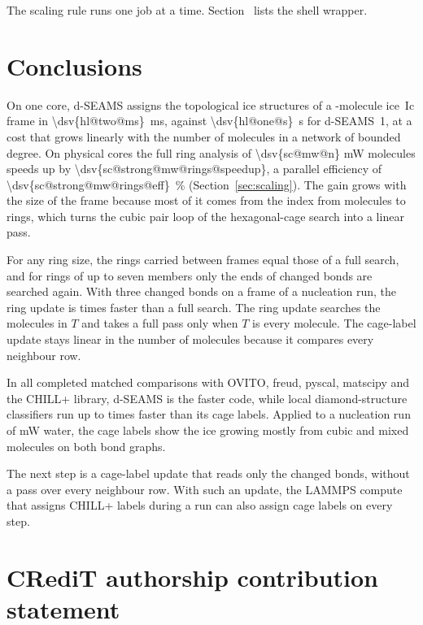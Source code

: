 \documentclass[preprint,12pt]{elsarticle}
\begin{document}
The scaling rule runs one job at a time.
Section~ lists the shell wrapper.

\section{Conclusions}
\label{sec:conclusions}

On one core, d-SEAMS assigns the topological ice structures of a -molecule ice~Ic frame in \qty{\dsv{hl@two@ms}}{\milli\second}, against \qty{\dsv{hl@one@s}}{\second} for d-SEAMS~1, at a cost that grows linearly with the number of molecules in a network of bounded degree.
On  physical cores the full ring analysis of \num{\dsv{sc@mw@n}} mW molecules speeds up by \num{\dsv{sc@strong@mw@rings@speedup}}, a parallel efficiency of \qty{\dsv{sc@strong@mw@rings@eff}}{\percent} (Section~\ref{sec:scaling}).
The gain grows with the size of the frame because most of it comes from the index from molecules to rings, which turns the cubic pair loop of the hexagonal-cage search into a linear pass.

For any ring size, the rings carried between frames equal those of a full search, and for rings of up to seven members only the ends of changed bonds are searched again.
With three changed bonds on a frame of a nucleation run, the ring update is  times faster than a full search.
The ring update searches the molecules in $T$ and takes a full pass only when $T$ is every molecule.
The cage-label update stays linear in the number of molecules because it compares every neighbour row.

In all  completed matched comparisons with OVITO, freud, pyscal, matscipy and the CHILL+ library, d-SEAMS is the faster code, while local diamond-structure classifiers run up to  times faster than its cage labels.
Applied to a nucleation run of mW water, the cage labels show the ice growing mostly from cubic and mixed molecules on both bond graphs.

The next step is a cage-label update that reads only the changed bonds, without a pass over every neighbour row.
With such an update, the LAMMPS compute that assigns CHILL+ labels during a run can also assign cage labels on every step.

\section*{CRediT authorship contribution statement}
\end{document}

